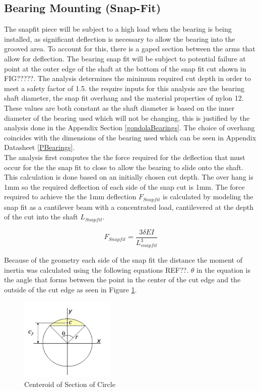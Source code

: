 \documentclass[../main.tex]{subfiles}
\begin{document}
\subsection{Bearing Mounting (Snap-Fit)} \label{snapFit}
The snapfit piece will be subject to a high load when the bearing is being installed, as significant deflection is necessary to allow the bearing into the grooved area. To account for this, there is a gaped section between the arms that allow for deflection. The bearing snap fit will be subject to potential failure at point at the outer edge of the shaft at the bottom of the snap fit cut shown in FIG?????. The analysis determines the minimum required cut depth in order to meet a safety factor of 1.5. the require inputs for this analysis are the bearing shaft diameter, the snap fit overhang and the material properties of nylon 12. These values are both constant as the shaft diameter is based on the inner diameter of the bearing used which will not be changing, this is justified by the analysis done in the Appendix Section \ref{gondolaBearings}. The choice of overhang coincides with the dimensions of the bearing used which can be seen in Appendix Datasheet \ref{PBearings}.\\  

The analysis first computes the the force required for the deflection that must occur for the the snap fit to close to allow the bearing to slide onto the shaft. This calculation is done based on an initially chosen cut depth. The over hang is 1mm so the required deflection of each side of the snap cut is 1mm. The force required to achieve the the 1mm deflection $F_{Snapfit}$ is calculated by modeling the snap fit as a cantilever beam with a concentrated load, cantilevered at the depth of the cut into the shaft $L_{Snapfit}$. 

\begin{equation}
\label{eqn:Fsnap}
F_{Snapfit} = \frac{3 \delta E I}{L_{snapfit}^3}
\end{equation}

Because of the geometry each side of the snap fit the distance the moment of inertia was calculated using the following equations REF??. $\theta$ in the equation is the angle that forms between the point in the center of the cut edge and the outside of the cut edge as seen in Figure \ref{fig:circleSection}.
\begin{figure}[H]
	\centering
	\includegraphics[width=0.4\textwidth]{img/Gondola/circleSectionGeometry.jpg}
	\caption{Centeroid of Section of Circle \cite{circlesection}}
	\label{fig:circleSection}
\end{figure}
\end{document}
